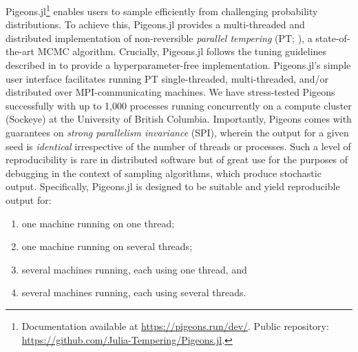 Pigeons.jl\footnote{Documentation available at \url{https://pigeons.run/dev/}. 
Public repository: \url{https://github.com/Julia-Tempering/Pigeons.jl}.}
enables users to sample efficiently from challenging probability distributions.
To achieve this, Pigeons.jl provides a multi-threaded and distributed implementation
of non-reversible \emph{parallel tempering}
(PT; \citealp{syed2021nrpt,syed2021paths,surjanovic2022vpt,surjanovic2024ergodicity}), 
a state-of-the-art MCMC algorithm.
Crucially, Pigeons.jl follows the tuning guidelines described in \citet{syed2021nrpt} 
to provide a hyperparameter-free implementation.
Pigeons.jl's simple user interface facilitates running PT
single-threaded, multi-threaded, and/or distributed over MPI-communicating machines. 
We have stress-tested Pigeons successfully with up to 1,000 processes running 
concurrently on a compute cluster (Sockeye) at the University of British Columbia.
Importantly, Pigeons comes with guarantees on \emph{strong parallelism invariance} (SPI), 
wherein the output for a given seed is \emph{identical} irrespective of the number 
of threads or processes. Such a level of reproducibility is rare in distributed 
software but of great use for the purposes of debugging in the context of sampling 
algorithms, which produce stochastic output.
Specifically, Pigeons.jl is designed to be suitable and yield reproducible output for:
\begin{enumerate}
    \item one machine running on one thread;
    \item one machine running on several threads;
    \item several machines running, each using one thread, and
    \item several machines running, each using several threads.
\end{enumerate}





